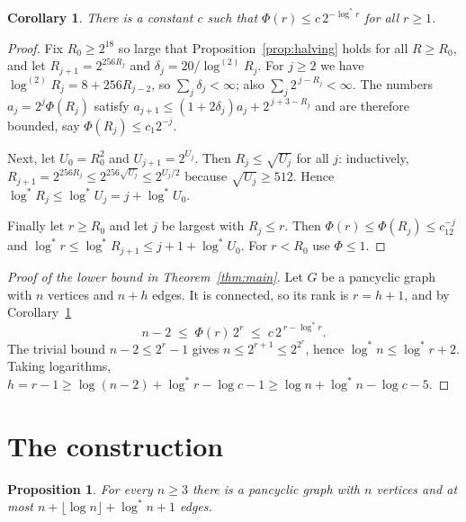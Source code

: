 \documentclass[11pt]{article}
\newtheorem{proposition}[theorem]{Proposition}
\newtheorem{corollary}[theorem]{Corollary}
\theoremstyle{definition}
\theoremstyle{remark}
\newcommand{\lgs}{\log^{*}}
\newcommand{\lgk}[1]{\log^{(#1)}}
\begin{document}
\begin{corollary}\label{cor:phi}
There is a constant $c$ such that $\Phi(r)\le c\,2^{-\lgs r}$ for all $r\ge1$.
\end{corollary}

\begin{proof}
Fix $R_0\ge2^{18}$ so large that Proposition~\ref{prop:halving} holds for all $R\ge R_0$, and let
$R_{j+1}=2^{256R_j}$ and $\delta_j=20/\lgk2R_j$. For $j\ge2$ we have $\lgk2R_j=8+256R_{j-2}$, so
$\sum_j\delta_j<\infty$; also $\sum_j2^{\,j-R_j}<\infty$. The numbers $a_j=2^{j}\Phi(R_j)$ satisfy
$a_{j+1}\le(1+2\delta_j)a_j+2^{\,j+3-R_j}$ and are therefore bounded, say $\Phi(R_j)\le c_1 2^{-j}$.

Next, let $U_0=R_0^2$ and $U_{j+1}=2^{U_j}$. Then $R_j\le\sqrt{U_j}$ for all $j$: inductively,
$R_{j+1}=2^{256R_j}\le2^{256\sqrt{U_j}}\le2^{U_j/2}$ because $\sqrt{U_j}\ge512$. Hence
$\lgs R_j\le\lgs U_j=j+\lgs U_0$.

Finally let $r\ge R_0$ and let $j$ be largest with $R_j\le r$. Then
$\Phi(r)\le\Phi(R_j)\le c_12^{-j}$ and $\lgs r\le\lgs R_{j+1}\le j+1+\lgs U_0$. For $r<R_0$ use
$\Phi\le1$.
\end{proof}

\begin{proof}[Proof of the lower bound in Theorem~\ref{thm:main}]
Let $G$ be a pancyclic graph with $n$ vertices and $n+h$ edges. It is connected, so its rank is
$r=h+1$, and by Corollary~\ref{cor:phi}
\[
  n-2\;\le\;\Phi(r)\,2^{r}\;\le\;c\,2^{\,r-\lgs r}.
\]
The trivial bound $n-2\le2^{r}-1$ gives $n\le2^{r+1}\le2^{2^{r}}$, hence $\lgs n\le\lgs r+2$. Taking
logarithms, $h=r-1\ge\log(n-2)+\lgs r-\log c-1\ge\log n+\lgs n-\log c-5$.
\end{proof}

\section{The construction}\label{sec:upper}

\begin{proposition}\label{prop:upper}
For every $n\ge3$ there is a pancyclic graph with $n$ vertices and at most
$n+\lfloor\log n\rfloor+\lgs n+1$ edges.
\end{proposition}
\end{document}
